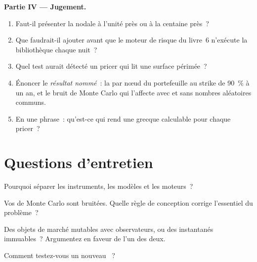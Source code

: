 \begin{problem}
\medskip\noindent\textbf{Partie IV --- Jugement.}
\begin{enumerate}[resume]
\item Faut-il présenter la  nodale à l'unité près ou à la centaine près~?
\item Que faudrait-il ajouter avant que le moteur de risque du livre~6 n'exécute la bibliothèque chaque nuit~?
\item Quel test aurait détecté un pricer qui lit une surface périmée~?
\item Énoncer le \emph{résultat nommé}~: la  par nœud du portefeuille au strike de 90~\% à un an, et le bruit de Monte Carlo qui l'affecte avec et sans nombres aléatoires communs.
\item En une phrase~: qu'est-ce qui rend une grecque calculable pour chaque pricer~?
\end{enumerate}
\end{problem}

\section{Questions d'entretien}

\begin{interviewq}\label{iq:dv:build-a-pricing-library:1}
Pourquoi séparer les instruments, les modèles et les moteurs~?
\end{interviewq}

\begin{interviewq}\label{iq:dv:build-a-pricing-library:2}
Vos  de Monte Carlo sont bruitées. Quelle règle de conception corrige l'essentiel du problème~?
\end{interviewq}

\begin{interviewq}\label{iq:dv:build-a-pricing-library:3}
Des objets de marché mutables avec observateurs, ou des instantanés immuables~? Argumentez en faveur de l'un des deux.
\end{interviewq}

\begin{interviewq}\label{iq:dv:build-a-pricing-library:4}
Comment testez-vous un nouveau ~?
\end{interviewq}

